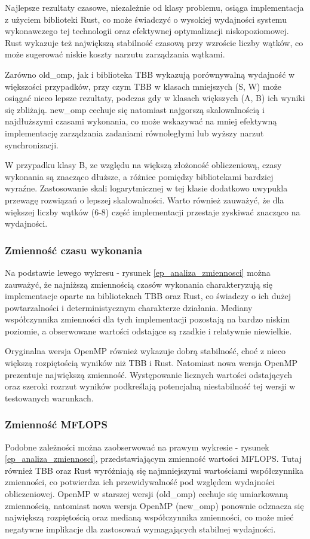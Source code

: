 Najlepsze rezultaty czasowe, niezależnie od klasy problemu, osiąga implementacja z użyciem biblioteki Rust, co może świadczyć o wysokiej wydajności systemu wykonawczego tej technologii oraz efektywnej optymalizacji niskopoziomowej. Rust wykazuje też największą stabilność czasową przy wzroście liczby wątków, co może sugerować niskie koszty narzutu zarządzania wątkami.

Zarówno old\_omp, jak i biblioteka TBB wykazują porównywalną wydajność w większości przypadków, przy czym TBB w klasach mniejszych (S, W) może osiągać nieco lepsze rezultaty, podczas gdy w klasach większych (A, B) ich wyniki się zbliżają. new\_omp cechuje się natomiast najgorszą skalowalnością i najdłuższymi czasami wykonania, co może wskazywać na mniej efektywną implementację zarządzania zadaniami równoległymi lub wyższy narzut synchronizacji.

W przypadku klasy B, ze względu na większą złożoność obliczeniową, czasy wykonania są znacząco dłuższe, a różnice pomiędzy bibliotekami bardziej wyraźne. Zastosowanie skali logarytmicznej w tej klasie dodatkowo uwypukla przewagę rozwiązań o lepszej skalowalności. Warto również zauważyć, że dla większej liczby wątków (6-8) część implementacji przestaje zyskiwać znacząco na wydajności.

\subsubsection{Zmienność czasu wykonania}
Na podstawie lewego wykresu - rysunek \ref{ep_analiza_zmiennosci} można zauważyć, że najniższą zmiennością czasów wykonania charakteryzują się implementacje oparte na bibliotekach TBB oraz Rust, co świadczy o ich dużej powtarzalności i deterministycznym charakterze działania. Mediany współczynnika zmienności dla tych implementacji pozostają na bardzo niskim poziomie, a obserwowane wartości odstające są rzadkie i relatywnie niewielkie.

Oryginalna wersja OpenMP również wykazuje dobrą stabilność, choć z nieco większą rozpiętością wyników niż TBB i Rust. Natomiast nowa wersja OpenMP prezentuje największą zmienność. Występowanie licznych wartości odstających oraz szeroki rozrzut wyników podkreślają potencjalną niestabilność tej wersji w testowanych warunkach.

\subsubsection{Zmienność MFLOPS}
Podobne zależności można zaobserwować na prawym wykresie - rysunek \ref{ep_analiza_zmiennosci}, przedstawiającym zmienność wartości MFLOPS. Tutaj również TBB oraz Rust wyróżniają się najmniejszymi wartościami współczynnika zmienności, co potwierdza ich przewidywalność pod względem wydajności obliczeniowej. OpenMP w starszej wersji (old\_omp) cechuje się umiarkowaną zmiennością, natomiast nowa wersja OpenMP (new\_omp) ponownie odznacza się największą rozpiętością oraz medianą współczynnika zmienności, co może mieć negatywne implikacje dla zastosowań wymagających stabilnej wydajności.



